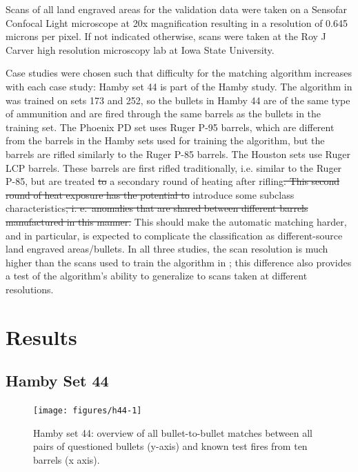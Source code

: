 \documentclass[doubleblind]{elsarticle}\usepackage[]{graphicx}\usepackage[]{color}
\newenvironment{knitrout}{}{} %
\providecommand{\DIFaddtex}[1]{{\protect\color{blue}\uwave{#1}}} %
\providecommand{\DIFdeltex}[1]{{\protect\color{red}\sout{#1}}}                      %
\providecommand{\DIFaddbegin}{} %
\providecommand{\DIFaddend}{} %
\providecommand{\DIFdelbegin}{} %
\providecommand{\DIFdelend}{} %
\providecommand{\DIFadd}[1]{\texorpdfstring{\DIFaddtex{#1}}{#1}} %
\providecommand{\DIFdel}[1]{\texorpdfstring{\DIFdeltex{#1}}{}} %
\newcommand{\DIFscaledelfig}{0.5}
\newlength{\DIFdelgraphicswidth} %
\newlength{\DIFdelgraphicsheight} %
\newcommand{\DIFaddincludegraphics}[2][]{{\color{blue}\fbox{\DIFOincludegraphics[#1]{#2}}}} %
\newcommand{\DIFdelincludegraphics}[2][]{%
\sbox{\DIFdelgraphicsbox}{\DIFOincludegraphics[#1]{#2}}%
\settoboxwidth{\DIFdelgraphicswidth}{\DIFdelgraphicsbox} %
\settoboxtotalheight{\DIFdelgraphicsheight}{\DIFdelgraphicsbox} %
\scalebox{\DIFscaledelfig}{%
\parbox[b]{\DIFdelgraphicswidth}{\usebox{\DIFdelgraphicsbox}\\[-\baselineskip] \rule{\DIFdelgraphicswidth}{0em}}\llap{\resizebox{\DIFdelgraphicswidth}{\DIFdelgraphicsheight}{%
\setlength{\unitlength}{\DIFdelgraphicswidth}%
\begin{picture}(1,1)%
\thicklines\linethickness{2pt} %
{\color[rgb]{1,0,0}\put(0,0){\framebox(1,1){}}}%
{\color[rgb]{1,0,0}\put(0,0){\line( 1,1){1}}}%
{\color[rgb]{1,0,0}\put(0,1){\line(1,-1){1}}}%
\end{picture}%
}\hspace*{3pt}}} %
} %
\DeclareRobustCommand{\DIFaddbegin}{\DIFOaddbegin \let\includegraphics\DIFaddincludegraphics} %
\DeclareRobustCommand{\DIFaddend}{\DIFOaddend \let\includegraphics\DIFOincludegraphics} %
\DeclareRobustCommand{\DIFdelbegin}{\DIFOdelbegin \let\includegraphics\DIFdelincludegraphics} %
\DeclareRobustCommand{\DIFdelend}{\DIFOaddend \let\includegraphics\DIFOincludegraphics} %
\begin{document}
Scans of all land engraved areas for the validation data were taken on a Sensofar Confocal Light microscope at 20x magnification resulting in a resolution of 0.645 microns per pixel. If not indicated otherwise, scans were taken at the Roy J Carver high resolution microscopy lab at Iowa State University.

Case studies were chosen such that \DIFaddbegin \DIFadd{theoretical }\DIFaddend difficulty for the matching algorithm increases with each case study: Hamby set 44 is part of the Hamby study. The algorithm in \citet{aoas2} was trained on sets 173 and 252, so the bullets in Hamby 44 are of the same type of ammunition and are fired through the same barrels as the bullets in the training set. The Phoenix PD set uses Ruger P-95 barrels, which are different from the barrels in the Hamby sets used for training the algorithm, but the barrels are rifled similarly to the Ruger P-85 barrels. The Houston sets use Ruger LCP barrels. These barrels are first rifled traditionally, i.e. similar to the Ruger P-85, but are treated \DIFdelbegin \DIFdel{to }\DIFdelend \DIFaddbegin \DIFadd{with }\DIFaddend a secondary round of heating after rifling\DIFdelbegin \DIFdel{. This second round of heat exposure has the potential to }\DIFdelend \DIFaddbegin \DIFadd{, which may }\DIFaddend introduce some subclass characteristics\DIFdelbegin \DIFdel{, i. e.\ anomalies that are shared between different barrels manufactured in this manner. }\DIFdelend \DIFaddbegin \DIFadd{. }\DIFaddend This should make the automatic matching harder, and in particular, is expected to complicate the classification as different-source land engraved areas/bullets. In all three studies, the scan resolution is much higher than the scans used to train the algorithm in \citet{aoas2}; this difference also provides a test of the algorithm's ability to generalize to scans taken at different resolutions.

\section{Results}

\subsection{Hamby Set 44}

\begin{knitrout}
\color{fgcolor}\begin{figure}

{\centering \texttt{[image: figures/h44-1]} 

}

\caption[Hamby set 44]{Hamby set 44: overview of all bullet-to-bullet matches between all pairs of questioned bullets (y-axis) and known test fires from ten barrels (x axis).}\label{fig:h44}
\end{figure}


\end{knitrout}
\end{document}
